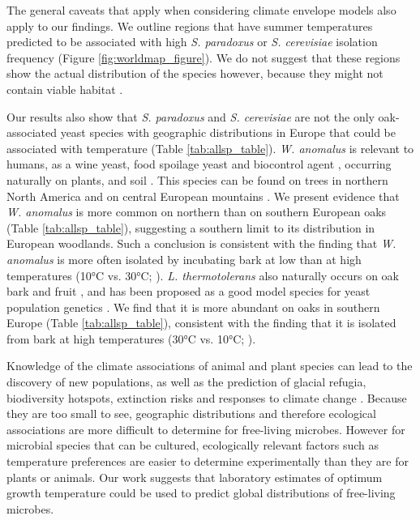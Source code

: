 \documentclass[12pt]{article}
\begin{document}
\begin{linenumbers}
The general caveats that apply when considering climate envelope models \citep{araujo_uses_2012,jarnevich_caveats_2015} also apply to our findings. We outline regions that have summer temperatures predicted to be associated with high \textit{S. paradoxus} or \textit{S. cerevisiae} isolation frequency (Figure \ref{fig:worldmap_figure}). We do not suggest that these regions show the actual distribution of the species however, because they might not contain viable habitat \citep{araujo_uses_2012,jarnevich_caveats_2015}. 

Our results also show that \textit{S. paradoxus} and \textit{S. cerevisiae} are not the only oak-associated yeast species with geographic distributions in Europe that could be associated with temperature (Table \ref{tab:allsp_table}). \textit{W. anomalus} is relevant to humans, as a wine yeast, food spoilage yeast and biocontrol agent \citep{passoth_biotechnology_2006}, occurring naturally on plants, and soil \citep{kurtzman_chapter_2011-2}. This species can be found on trees in northern North America \citep{charron_exploring_2014,sylvester_temperature_2015} and on central European mountains \citep{slavikova_yeasts_2007}. We present evidence that \textit{W. anomalus} is more common on northern than on southern European oaks (Table \ref{tab:allsp_table}), suggesting a southern limit to its distribution in European woodlands. Such a conclusion is consistent with the finding that \textit{W. anomalus} is more often isolated by incubating bark at low than at high temperatures (10\si{\degreeCelsius} vs. 30\si{\degreeCelsius}; \citealp{sylvester_temperature_2015}). \textit{L. thermotolerans} also naturally occurs on oak bark \citep{sampaio_natural_2008,charron_exploring_2014,sylvester_temperature_2015,freel_lachancea_2015} and fruit \citep{lachance_chapter_2011}, and has been proposed as a good model species for yeast population genetics \citep{freel_population_2014,freel_lachancea_2015}. We find that it is more abundant on oaks in southern Europe (Table \ref{tab:allsp_table}), consistent with the finding that it is isolated from bark at high temperatures (30\si{\degreeCelsius} vs. 10\si{\degreeCelsius}; \citealp{sylvester_temperature_2015}).

Knowledge of the climate associations of animal and plant species can lead to the discovery of new populations, as well as the prediction of glacial refugia, biodiversity hotspots, extinction risks and responses to climate change \citep{araujo_uses_2012,jarnevich_caveats_2015}. Because they are too small to see, geographic distributions and therefore ecological associations are more difficult to determine for free-living microbes. However for microbial species that can be cultured, ecologically relevant factors such as temperature preferences are easier to determine experimentally than they are for plants or animals. Our work suggests that laboratory estimates of optimum growth temperature could be used to predict global distributions of free-living microbes.



\end{linenumbers}
\end{document}
